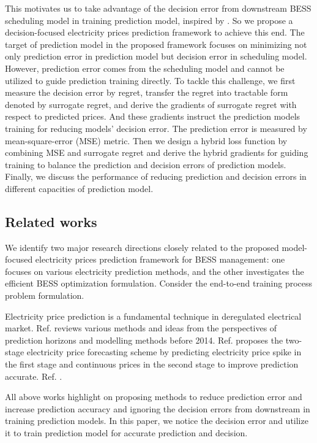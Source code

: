 \documentclass[journal]{IEEEtran}
\newcommand{\slw}{\color{blue}}
\begin{document}
This motivates us to take advantage of the decision error from downstream BESS scheduling model in training prediction model, inspired by \cite{Elmachtoub2020, Donti2017}. So we propose a decision-focused electricity prices prediction framework to achieve this end. The target of prediction model in the proposed framework focuses on minimizing not only prediction error in prediction model but decision error in scheduling model. However, prediction error comes from the scheduling model and cannot be utilized to guide prediction training directly. To tackle this challenge, we first measure the decision error by regret, transfer the regret into tractable form denoted by surrogate regret, and derive the gradients of surrogate regret with respect to predicted prices. And these gradients instruct the prediction models training for reducing models' decision error. The prediction error is measured by mean-square-error (MSE) metric. Then we design a hybrid loss function by combining MSE and surrogate regret and derive the hybrid gradients for guiding training to balance the prediction and decision errors of prediction models. Finally, we discuss the performance of reducing prediction and decision errors in different capacities of prediction model. 

\subsection{Related works}

We identify two major research directions closely related to the proposed model-focused electricity prices prediction framework for BESS management: one focuses on various electricity prediction methods, and the other investigates the efficient BESS optimization formulation. {\slw Consider the end-to-end training process problem formulation.}

Electricity price prediction is a fundamental technique in deregulated electrical market. Ref. \cite{Weron2014} reviews various methods and ideas from the perspectives of prediction horizons and modelling methods before 2014. Ref. \cite{Shi2021} proposes the two-stage electricity price forecasting scheme by predicting electricity price spike in the first stage and continuous prices in the second stage to improve prediction accurate. Ref. \cite{Chitsaz2018}. 

All above works highlight on proposing methods to reduce prediction error and increase prediction accuracy and ignoring the decision errors from downstream in training prediction models. In this paper, we notice the decision error and utilize it to train prediction model for accurate prediction and decision.
\end{document}
